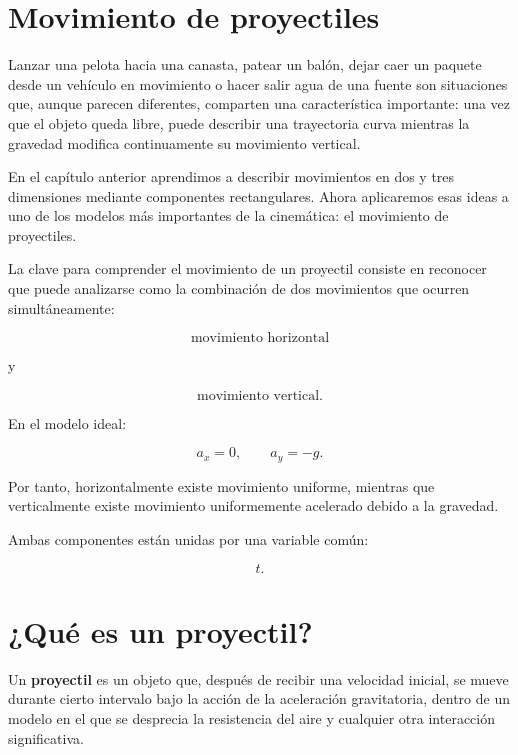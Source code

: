 ﻿\section{Movimiento de proyectiles}

Lanzar una pelota hacia una canasta, patear un balón, dejar caer un paquete desde
un vehículo en movimiento o hacer salir agua de una fuente son situaciones que,
aunque parecen diferentes, comparten una característica importante: una vez que
el objeto queda libre, puede describir una trayectoria curva mientras la gravedad
modifica continuamente su movimiento vertical.

En el capítulo anterior aprendimos a describir movimientos en dos y tres
dimensiones mediante componentes rectangulares. Ahora aplicaremos esas ideas a
uno de los modelos más importantes de la cinemática: el movimiento de
proyectiles.

\begin{idea}
La clave para comprender el movimiento de un proyectil consiste en reconocer que
puede analizarse como la combinación de dos movimientos que ocurren
simultáneamente:

\[
\text{movimiento horizontal}
\]

y

\[
\text{movimiento vertical}.
\]

En el modelo ideal:

\[
a_x=0,
\qquad
a_y=-g.
\]

Por tanto, horizontalmente existe movimiento uniforme, mientras que
verticalmente existe movimiento uniformemente acelerado debido a la gravedad.

Ambas componentes están unidas por una variable común:

\[
\boxed{t}.
\]
\end{idea}


\section{¿Qué es un proyectil?}

\begin{definicion}[Proyectil]
Un \textbf{proyectil} es un objeto que, después de recibir una velocidad inicial,
se mueve durante cierto intervalo bajo la acción de la aceleración gravitatoria,
dentro de un modelo en el que se desprecia la resistencia del aire y cualquier
otra interacción significativa.
\end{definicion}

